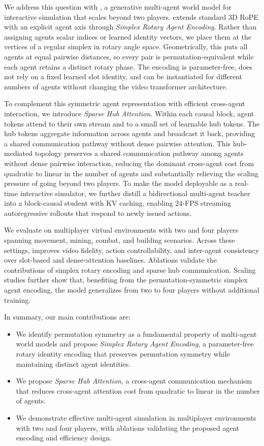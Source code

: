 We address this question with \ours, a generative multi-agent world model for interactive simulation that scales beyond two players.
\ours extends standard 3D RoPE with an explicit agent axis through \emph{Simplex Rotary Agent Encoding}.
Rather than assigning agents scalar indices or learned identity vectors, we place them at the vertices of a regular simplex in rotary angle space.
Geometrically, this puts all agents at equal pairwise distances, so every pair is permutation-equivalent while each agent retains a distinct rotary phase.
The encoding is parameter-free, does not rely on a fixed learned slot identity, and can be instantiated for different numbers of agents without changing the video transformer architecture.


To complement this symmetric agent representation with efficient cross-agent interaction, we introduce \emph{Sparse Hub Attention}.
Within each causal block, agent tokens attend to their own stream and to a small set of learnable hub tokens.
The hub tokens aggregate information across agents and broadcast it back, providing a shared communication pathway without dense pairwise attention.
This hub-mediated topology preserves a shared communication pathway among agents without dense pairwise interaction, reducing the dominant cross-agent cost from quadratic to linear in the number of agents and substantially relieving the scaling pressure of going beyond two players.
To make the model deployable as a real-time interactive simulator, we further distill a bidirectional multi-agent teacher into a block-causal student with KV caching, enabling 24-FPS streaming autoregressive rollouts that respond to newly issued actions.

We evaluate \ours on multiplayer virtual environments with two and four players spanning movement, mining, combat, and building scenarios.
Across these settings, \ours improves video fidelity, action controllability, and inter-agent consistency over slot-based and dense-attention baselines. 
Ablations validate the contributions of simplex rotary encoding and sparse hub communication. Scaling studies further show that, benefiting from the permutation-symmetric simplex agent encoding, the model generalizes from two to four players without additional training. 

In summary, our main contributions are:
\begin{itemize}
    \setlength{\itemsep}{0pt}
    \setlength{\parsep}{0pt}
    \setlength{\topsep}{0pt}
    \item We identify permutation symmetry as a fundamental property of multi-agent world models and propose \emph{Simplex Rotary Agent Encoding}, a parameter-free rotary identity encoding that preserves permutation symmetry while maintaining distinct agent identities.
    \item We propose \emph{Sparse Hub Attention}, a cross-agent communication mechanism that reduces cross-agent attention cost from quadratic to linear in the number of agents.
    \item We demonstrate effective multi-agent simulation in multiplayer environments with two and four players, with ablations validating the proposed agent encoding and efficiency design.
\end{itemize}
